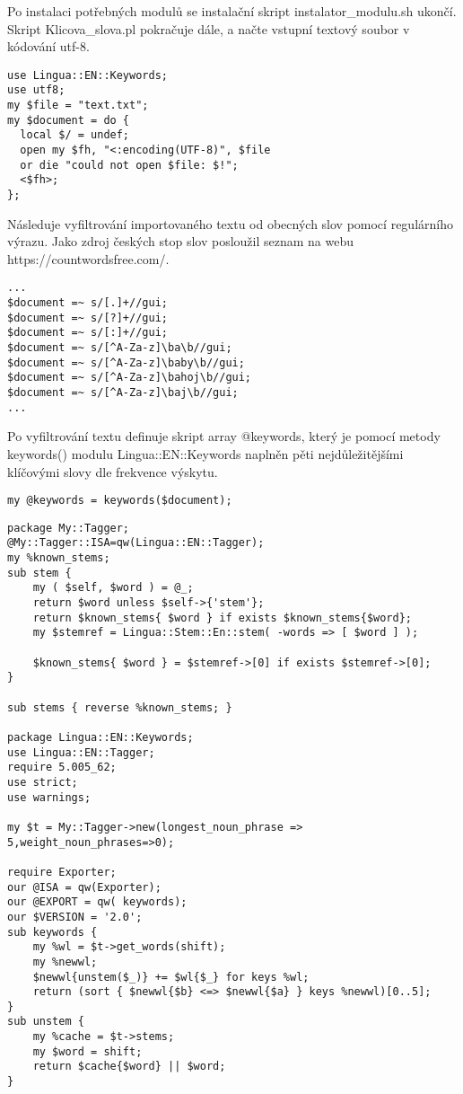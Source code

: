\documentclass[a4paper,11pt]{article}
\theoremstyle{mytheor}
\begin{document}
Po instalaci potřebných modulů se instalační skript
instalator\_modulu.sh ukončí. Skript Klicova\_slova.pl pokračuje
dále, a načte vstupní textový soubor v kódování utf-8.

\begin{lstlisting}[label={list:first},caption=Perl skript načítá vstup -- Analyzátor klíčových slov.]
use Lingua::EN::Keywords;
use utf8;
my $file = "text.txt";
my $document = do {
  local $/ = undef;
  open my $fh, "<:encoding(UTF-8)", $file
  or die "could not open $file: $!";
  <$fh>;
};
\end{lstlisting}

Následuje vyfiltrování importovaného textu od obecných slov pomocí
regulárního výrazu. Jako zdroj českých stop slov posloužil seznam na
webu https://countwordsfree.com/.

\begin{lstlisting}[label={list:first},caption=Odfiltrování stop slov a znaků -- Analyzátor klíčových slov.]
...
$document =~ s/[.]+//gui;
$document =~ s/[?]+//gui;
$document =~ s/[:]+//gui;
$document =~ s/[^A-Za-z]\ba\b//gui;
$document =~ s/[^A-Za-z]\baby\b//gui;
$document =~ s/[^A-Za-z]\bahoj\b//gui;
$document =~ s/[^A-Za-z]\baj\b//gui;
...
\end{lstlisting}

Po vyfiltrování textu definuje skript array @keywords, který je
pomocí metody keywords() modulu Lingua::EN::Keywords naplněn pěti
nejdůležitějšími klíčovými slovy dle frekvence výskytu.

\begin{lstlisting}[label={list:first},caption=Volání metody keywords() modulu Lingua::EN::Keywords -- Analyzátor klíčových slov.]
my @keywords = keywords($document);
\end{lstlisting}

\begin{lstlisting}[label={list:first},caption=Modul Lingua::EN::Tagger extrahuje 5 nejdůležitějších klíčových slov -- Zdroj: https://metacpan.org/source/SIMON/Lingua-EN-Keywords-2.0/Keywords.pm.]
package My::Tagger;
@My::Tagger::ISA=qw(Lingua::EN::Tagger);
my %known_stems;
sub stem {
    my ( $self, $word ) = @_;
    return $word unless $self->{'stem'};
    return $known_stems{ $word } if exists $known_stems{$word};
    my $stemref = Lingua::Stem::En::stem( -words => [ $word ] );
 
    $known_stems{ $word } = $stemref->[0] if exists $stemref->[0];
}
 
sub stems { reverse %known_stems; }
 
package Lingua::EN::Keywords;
use Lingua::EN::Tagger;
require 5.005_62;
use strict;
use warnings;
 
my $t = My::Tagger->new(longest_noun_phrase => 5,weight_noun_phrases=>0);
 
require Exporter;
our @ISA = qw(Exporter);
our @EXPORT = qw( keywords);
our $VERSION = '2.0';
sub keywords {
    my %wl = $t->get_words(shift);
    my %newwl; 
    $newwl{unstem($_)} += $wl{$_} for keys %wl;
    return (sort { $newwl{$b} <=> $newwl{$a} } keys %newwl)[0..5];
}
sub unstem {
    my %cache = $t->stems;
    my $word = shift;
    return $cache{$word} || $word;
}
\end{lstlisting}
\end{document}
